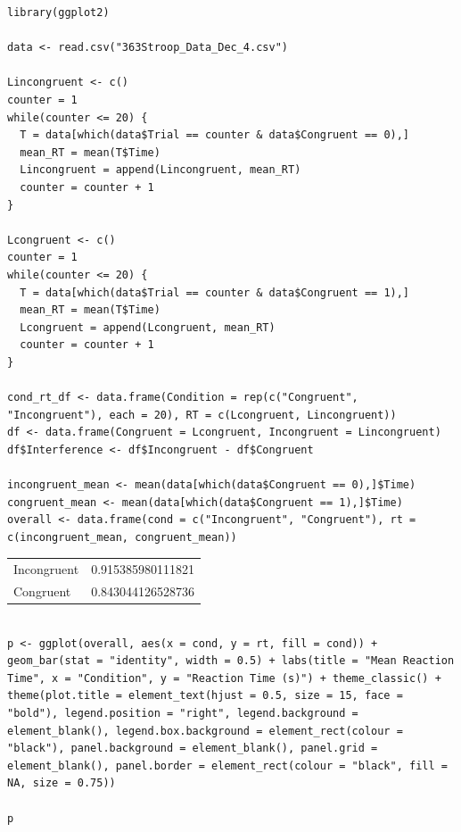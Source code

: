 \documentclass{article}
\begin{document}
\begin{verbatim}
library(ggplot2)

data <- read.csv("363Stroop_Data_Dec_4.csv")

Lincongruent <- c()
counter = 1
while(counter <= 20) {
  T = data[which(data$Trial == counter & data$Congruent == 0),]
  mean_RT = mean(T$Time)
  Lincongruent = append(Lincongruent, mean_RT)
  counter = counter + 1
}

Lcongruent <- c()
counter = 1
while(counter <= 20) {
  T = data[which(data$Trial == counter & data$Congruent == 1),]
  mean_RT = mean(T$Time)
  Lcongruent = append(Lcongruent, mean_RT)
  counter = counter + 1
}

cond_rt_df <- data.frame(Condition = rep(c("Congruent", "Incongruent"), each = 20), RT = c(Lcongruent, Lincongruent))
df <- data.frame(Congruent = Lcongruent, Incongruent = Lincongruent)
df$Interference <- df$Incongruent - df$Congruent

incongruent_mean <- mean(data[which(data$Congruent == 0),]$Time)
congruent_mean <- mean(data[which(data$Congruent == 1),]$Time)
overall <- data.frame(cond = c("Incongruent", "Congruent"), rt = c(incongruent_mean, congruent_mean))

\end{verbatim}

\begin{center}
\begin{tabular}{lr}
Incongruent & 0.915385980111821\\
Congruent & 0.843044126528736\\
\end{tabular}
\end{center}





\begin{verbatim}

p <- ggplot(overall, aes(x = cond, y = rt, fill = cond)) + geom_bar(stat = "identity", width = 0.5) + labs(title = "Mean Reaction Time", x = "Condition", y = "Reaction Time (s)") + theme_classic() + theme(plot.title = element_text(hjust = 0.5, size = 15, face = "bold"), legend.position = "right", legend.background = element_blank(), legend.box.background = element_rect(colour = "black"), panel.background = element_blank(), panel.grid = element_blank(), panel.border = element_rect(colour = "black", fill = NA, size = 0.75))

p

\end{verbatim}
\end{document}
